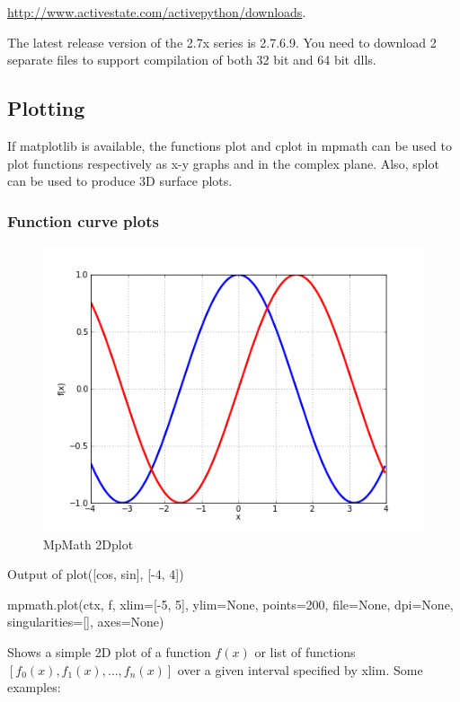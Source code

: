 \vpara
\href{http://www.activestate.com/activepython/downloads}{http://www.activestate.com/activepython/downloads}.

\vpara
The latest release version of the 2.7x series is 2.7.6.9. You need to download 2 separate files to support compilation of both 32 bit and 64 bit dlls.






\newpage
\subsection{Plotting}

If matplotlib is available, the functions plot and cplot in mpmath can be used to plot functions respectively as x-y graphs and in the complex plane. Also, splot can be used to
produce 3D surface plots.

\subsubsection{Function curve plots}

\begin{figure}[ht]
	\centering
	\includegraphics[scale=1.0]{Charts/png/MpMathPlot.png}
	\caption{MpMath 2Dplot}
	\label{Fig MpMath 2Dplot}
\end{figure}


Output of plot([cos, sin], [-4, 4])

\vpara
mpmath.plot(ctx, f, xlim=[-5, 5], ylim=None, points=200, file=None, dpi=None, singularities=[], axes=None)

\vpara
Shows a simple 2D plot of a function $f(x)$ or list of functions $[f_0(x),f_1(x),\ldots,f_n(x)]$ over a given interval specified by xlim. Some examples:

